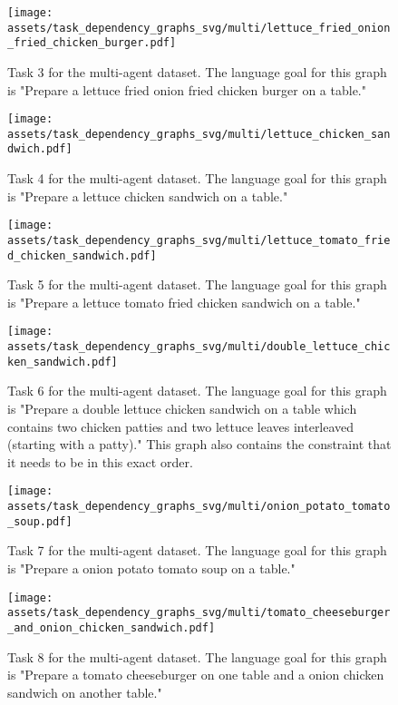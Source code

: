 \begin{figure}[H]
    \centering
    \texttt{[image: assets/task\_dependency\_graphs\_svg/multi/lettuce\_fried\_onion\_fried\_chicken\_burger.pdf]}
    \caption{Task 3 for the multi-agent dataset. The language goal for this graph is "Prepare a lettuce fried onion fried chicken burger on a table."}
    \label{2_multi}
\end{figure}

\begin{figure}[H]
    \centering
    \texttt{[image: assets/task\_dependency\_graphs\_svg/multi/lettuce\_chicken\_sandwich.pdf]}
    \caption{Task 4 for the multi-agent dataset. The language goal for this graph is "Prepare a lettuce chicken sandwich on a table."}
    \label{3_multi}
\end{figure}

\begin{figure}[H]
    \centering
    \texttt{[image: assets/task\_dependency\_graphs\_svg/multi/lettuce\_tomato\_fried\_chicken\_sandwich.pdf]}
    \caption{Task 5 for the multi-agent dataset. The language goal for this graph is "Prepare a lettuce tomato fried chicken sandwich on a table."}
    \label{4_multi}
\end{figure}

\begin{figure}[H]
    \centering
    \texttt{[image: assets/task\_dependency\_graphs\_svg/multi/double\_lettuce\_chicken\_sandwich.pdf]}
    \caption{Task 6 for the multi-agent dataset. The language goal for this graph is "Prepare a double lettuce chicken sandwich on a table which contains two chicken patties and two lettuce leaves interleaved (starting with a patty)." This graph also contains the constraint that it needs to be in this exact order.}
    \label{5_multi}
\end{figure}

\begin{figure}[H]
    \centering
    \texttt{[image: assets/task\_dependency\_graphs\_svg/multi/onion\_potato\_tomato\_soup.pdf]}
    \caption{Task 7 for the multi-agent dataset. The language goal for this graph is "Prepare a onion potato tomato soup on a table."}
    \label{6_multi}
\end{figure}

\begin{figure}[H]
    \centering
    \texttt{[image: assets/task\_dependency\_graphs\_svg/multi/tomato\_cheeseburger\_and\_onion\_chicken\_sandwich.pdf]}
    \caption{Task 8 for the multi-agent dataset. The language goal for this graph is "Prepare a tomato cheeseburger on one table and a onion chicken sandwich on another table."}
    \label{7_multi}
\end{figure}

